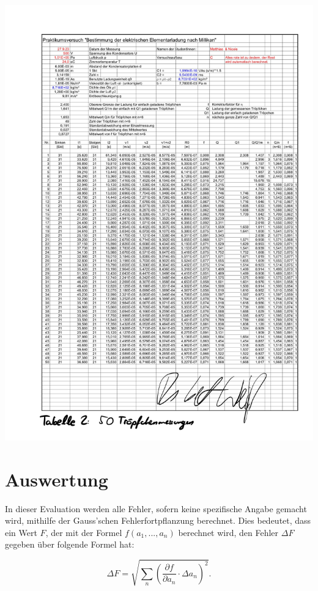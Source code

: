 \documentclass{article}
\begin{document}
\includegraphics[width=\textwidth]{graphics/mess3.jpg}
\newpage

\addtocounter{table}{2}

\section{Auswertung}

In dieser Evaluation werden alle Fehler, sofern keine spezifische Angabe gemacht wird, mithilfe der Gauss'schen Fehlerfortpflanzung berechnet. Dies bedeutet, dass ein Wert $F$, der mit der Formel $f(a_1, ..., a_n)$ berechnet wird, den Fehler $\Delta F$ gegeben über folgende Formel hat:

\begin{equation}
    \Delta F = \sqrt{\sum_n \left( \frac{\partial f}{\partial a_n} \cdot \Delta a_n \right)^2}.
\end{equation}
\end{document}

